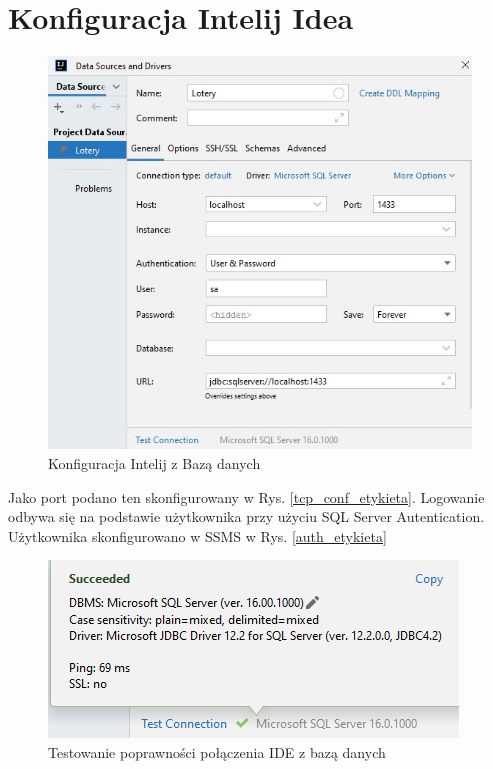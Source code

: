 \section{Konfiguracja Intelij Idea}

\begin{figure}[h]
		\centering
    \includegraphics[scale=0.6]{rys05/intelij_config_database.jpg}
    \caption{Konfiguracja Intelij z Bazą danych}
    \label{intelij_db_config_etykieta}
\end{figure}

Jako port podano ten skonfigurowany w Rys. \ref{tcp_conf_etykieta}. Logowanie odbywa się na podstawie użytkownika przy użyciu SQL Server Autentication. Użytkownika skonfigurowano w SSMS w Rys. \ref{auth_etykieta} 


\begin{figure}[h]
		\centering
    \includegraphics[scale=1.0]{rys05/test_connection.png}
    \caption{Testowanie poprawności połączenia IDE z bazą danych}
    \label{test_connection_etykieta}
\end{figure}

